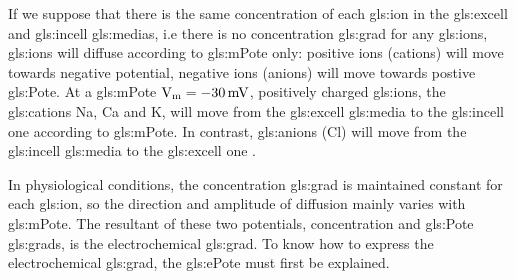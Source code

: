 \documentclass[class={myRUCProject}, crop=false]{standalone}
\begin{document}
If we suppose that there is the same concentration of each \gls{gls:ion} in the \gls{gls:excell} and \gls{gls:incell} \glspl{gls:media}, i.e there is no concentration \gls{gls:grad} for any \glspl{gls:ion}, \glspl{gls:ion} will diffuse according to \gls{gls:mPote} only: positive ions (cations) will move towards negative potential, negative ions (anions) will move towards postive \gls{gls:Pote}. At a \gls{gls:mPote} \(\unit{\V\membrane}=\qty{-30}{\mV}\), positively charged \glspl{gls:ion}, the \glspl{gls:cation} \gls{Na}, \gls{Ca} and \gls{K}, will move from the \gls{gls:excell} \gls{gls:media} to the \gls{gls:incell} one according to \gls{gls:mPote}. In contrast, \glspl{gls:anion} (\gls{Cl}) will move from the \gls{gls:incell} \gls{gls:media} to the \gls{gls:excell} one \cite{Hammond2015ch3}. 

In physiological conditions, the concentration \gls{gls:grad} is maintained constant for each \gls{gls:ion}, so the direction and amplitude of diffusion mainly varies with \gls{gls:mPote}. 
The resultant of these two potentials, concentration and \gls{gls:Pote} \glspl{gls:grad}, is the electrochemical \gls{gls:grad}. To know how to express the electrochemical \gls{gls:grad}, the \gls{gls:ePote} must first be explained.
 
\end{document}
